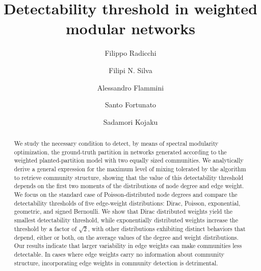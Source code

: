 \documentclass[a4paper,pre,superscriptaddress,floatfix,nofootinbib,twocolumn]{revtex4-1}
\begin{document}
\title{Detectability threshold in weighted modular networks}



\author{Filippo Radicchi}

\author{Filipi N. Silva}

\author{Alessandro Flammini}

\author{Santo Fortunato}

\author{Sadamori Kojaku}


\begin{abstract}
We study the necessary condition to detect, by means of spectral modularity optimization, the ground-truth partition in networks
generated according to the weighted planted-partition model with two equally sized communities.
We analytically derive a general expression for the maximum level of mixing tolerated by the algorithm to retrieve community structure, showing that
the value of this detectability threshold depends on the first two moments of the distributions of node degree and edge weight.
We focus on the standard case of Poisson-distributed node degrees and compare the detectability thresholds of
five edge-weight distributions: Dirac, Poisson, exponential, geometric, and signed Bernoulli.
We show that Dirac distributed weights yield the smallest detectability threshold, while exponentially distributed weights increase the threshold by a factor of $\sqrt{2}$, with other distributions exhibiting distinct behaviors that depend, either or both, on the average values of the degree and weight distributions.
Our results indicate that larger variability in edge weights can make communities less detectable.
In cases where edge weights carry no information about community structure, incorporating edge weights in community detection is detrimental.
\end{abstract}
\end{document}

